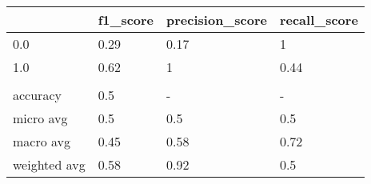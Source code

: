 \begin{tabular}{llll}
\toprule
{} & f1\_score & precision\_score & recall\_score \\
\midrule
0.0          &     0.29 &            0.17 &            1 \\
1.0          &     0.62 &               1 &         0.44 \\
             &          &                 &              \\
accuracy     &      0.5 &               - &            - \\
micro avg    &      0.5 &             0.5 &          0.5 \\
macro avg    &     0.45 &            0.58 &         0.72 \\
weighted avg &     0.58 &            0.92 &          0.5 \\
\bottomrule
\end{tabular}
